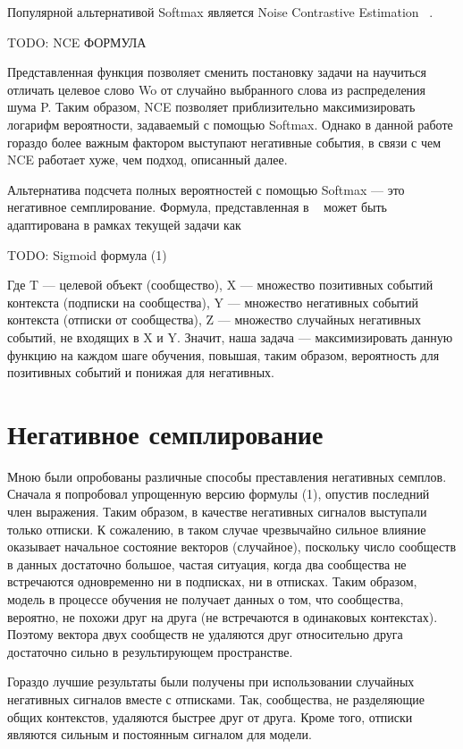 \documentclass[times,specification,annotation]{itmo-student-thesis}
\begin{document}
Популярной альтернативой Softmax является Noise Contrastive Estimation ~\cite{mikolov2013distributed}.

TODO: NCE ФОРМУЛА

Представленная функция позволяет сменить постановку задачи на научиться
отличать целевое слово Wo от случайно выбранного слова из распределения шума
P. Таким образом, NCE позволяет приблизительно максимизировать логарифм
вероятности, задаваемый с помощью Softmax. Однако в данной работе гораздо
более важным фактором выступают негативные события, в связи с чем NCE
работает хуже, чем подход, описанный далее.

Альтернатива подсчета полных вероятностей с помощью Softmax --- это
негативное семплирование. Формула, представленная в ~\cite{airbnb} может быть
адаптирована в рамках текущей задачи как

TODO: Sigmoid формула (1)

Где T --- целевой объект (сообщество), X --- множество позитивных событий
контекста (подписки на сообщества), Y --- множество негативных событий
контекста (отписки от сообщества), Z --- множество случайных негативных
событий, не входящих в X и Y. Значит, наша задача --- максимизировать данную
функцию на каждом шаге обучения, повышая, таким образом, вероятность для
позитивных событий и понижая для негативных.

\section{ Негативное семплирование}
Мною были опробованы различные способы преставления негативных
семплов. Сначала я попробовал упрощенную версию формулы (1), опустив
последний член выражения. Таким образом, в качестве негативных сигналов
выступали только отписки. К сожалению, в таком случае чрезвычайно сильное
влияние оказывает начальное состояние векторов (случайное), поскольку число
сообществ в данных достаточно большое, частая ситуация, когда два сообщества
не встречаются одновременно ни в подписках, ни в отписках. Таким образом,
модель в процессе обучения не получает данных о том, что сообщества, вероятно,
не похожи друг на друга (не встречаются в одинаковых контекстах). Поэтому
вектора двух сообществ не удаляются друг относительно друга достаточно сильно
в результирующем пространстве.

Гораздо лучшие результаты были получены при использовании случайных
негативных сигналов вместе с отписками. Так, сообщества, не разделяющие общих
контекстов, удаляются быстрее друг от друга. Кроме того, отписки являются
сильным и постоянным сигналом для модели.
\end{document}
